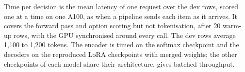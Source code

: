 Time per decision is the mean latency of one request over the dev rows, scored one at a time on one A100, as when a pipeline sends each item as it arrives.
It covers the forward pass and option scoring but not tokenisation, after 20 warm-up rows, with the GPU synchronised around every call.
The dev rows average 1{,}100 to 1{,}200 tokens.
The encoder is timed on the softmax checkpoint and the decoders on the reproduced LoRA checkpoints with merged weights; the other checkpoints of each model share their architecture.
 gives batched throughput.
